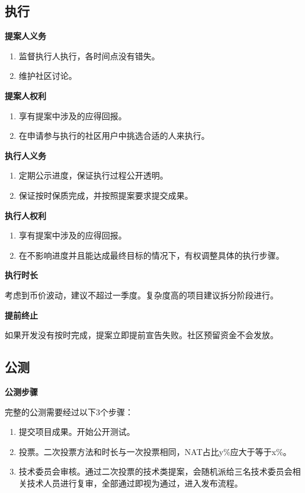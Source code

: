 \subsection{执行}
\textbf{提案人义务}
\begin{enumerate}
\item 监督执行人执行，各时间点没有错失。
\item 维护社区讨论。
\end{enumerate}

\textbf{提案人权利}
\begin{enumerate}
\item 享有提案中涉及的应得回报。
\item 在申请参与执行的社区用户中挑选合适的人来执行。
\end{enumerate}

\textbf{执行人义务}
\begin{enumerate}
\item 定期公示进度，保证执行过程公开透明。
\item 保证按时保质完成，并按照提案要求提交成果。
\end{enumerate}

\textbf{执行人权利}
\begin{enumerate}
\item 享有提案中涉及的应得回报。
\item 在不影响进度并且能达成最终目标的情况下，有权调整具体的执行步骤。
\end{enumerate}

\textbf{执行时长}

考虑到币价波动，建议不超过一季度。复杂度高的项目建议拆分阶段进行。

\textbf{提前终止}

如果开发没有按时完成，提案立即提前宣告失败。社区预留资金不会发放。

\subsection{公测}
\textbf{公测步骤}

完整的公测需要经过以下3个步骤：
\begin{enumerate}
\item 提交项目成果。开始公开测试。
\item 投票。二次投票方法和时长与一次投票相同，NAT占比y\%应大于等于x\%。
\item 技术委员会审核。通过二次投票的技术类提案，会随机派给三名技术委员会相关技术人员进行复审，全部通过即视为通过，进入发布流程。
\end{enumerate}

